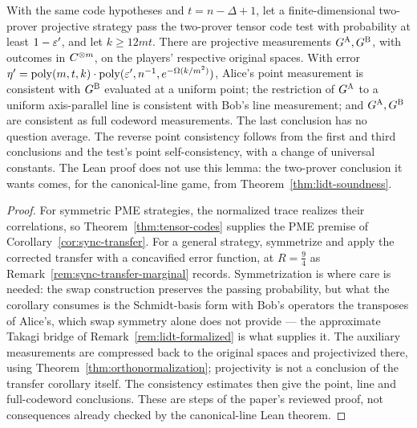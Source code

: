 \begin{lemma}
\label{lem:tensor-codes-bipartite}
With the same code hypotheses and $t=n-\Delta+1$, let a finite-dimensional two-prover
projective strategy pass the two-prover tensor code test with probability at least
$1-\varepsilon'$, and let $k\geq12mt$. There are projective measurements
$G^{\textsc{A}},G^{\textsc{B}}$, with outcomes in $C^{\otimes m}$, on the players' respective original
spaces. With error
$\eta'=\mathrm{poly}(m,t,k)\cdot\mathrm{poly}(\varepsilon',n^{-1},e^{-\Omega(k/m^2)})$, Alice's point
measurement is consistent with $G^{\textsc{B}}$ evaluated at a uniform point; the restriction
of $G^{\textsc{A}}$ to a uniform axis-parallel line is consistent with Bob's line
measurement; and $G^{\textsc{A}},G^{\textsc{B}}$ are consistent as full codeword measurements.
The last conclusion has no question average. The reverse point consistency follows
from the first and third conclusions and the test's point self-consistency, with a
change of universal constants.
The Lean proof does not use this lemma: the two-prover conclusion it wants comes, for the
canonical-line game, from Theorem~\ref{thm:lidt-soundness}.
\end{lemma}

\begin{proof}
For symmetric PME strategies, the normalized trace realizes their correlations, so
Theorem~\ref{thm:tensor-codes} supplies the PME premise of
Corollary~\ref{cor:sync-transfer}. For a general strategy, symmetrize and apply the
corrected transfer with a concavified error function, at $R = \tfrac94$ as
Remark~\ref{rem:sync-transfer-marginal} records. Symmetrization is where care is needed: the
swap construction preserves the passing probability, but what the corollary consumes is the
Schmidt-basis form with Bob's operators the transposes of Alice's, which swap symmetry alone
does not provide --- the approximate Takagi bridge of Remark~\ref{rem:lidt-formalized} is what
supplies it. The auxiliary measurements are compressed back to the original spaces
and projectivized there, using Theorem~\ref{thm:orthonormalization}; projectivity is
not a conclusion of the transfer corollary itself. The consistency estimates then
give the point, line and full-codeword conclusions. These are steps of the paper's
reviewed proof, not consequences already checked by the canonical-line Lean theorem.
\end{proof}

